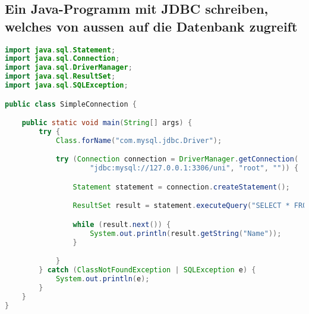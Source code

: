 \subsection{Ein Java-Programm mit JDBC schreiben, welches von aussen auf die Datenbank zugreift}

\begin{lstlisting}[language=Java,keywordstyle=\color{keywordcolor},caption={JDBC Beispielprogramm},label=lst:jdbc_sample]
import java.sql.Statement;
import java.sql.Connection;
import java.sql.DriverManager;
import java.sql.ResultSet;
import java.sql.SQLException;

public class SimpleConnection {

    public static void main(String[] args) {
        try {
            Class.forName("com.mysql.jdbc.Driver");

            try (Connection connection = DriverManager.getConnection(
                    "jdbc:mysql://127.0.0.1:3306/uni", "root", "")) {

                Statement statement = connection.createStatement();

                ResultSet result = statement.executeQuery("SELECT * FROM PROFESSOREN");

                while (result.next()) {
                    System.out.println(result.getString("Name"));
                }

            }
        } catch (ClassNotFoundException | SQLException e) {
            System.out.println(e);
        }
    }
}
\end{lstlisting}